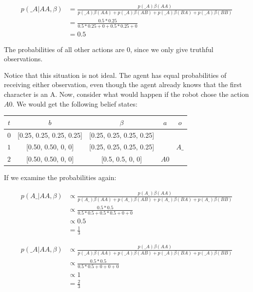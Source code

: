 \documentclass{article}
\begin{document}
\begin{align*}
	p(\_A | AA, \beta) &= \frac{ p(\_A)\beta(AA) }{ p(\_A)\beta(AA) + p(\_A)\beta(AB) + p(\_A)\beta(BA) + p(\_A)\beta(BB)} \\
	&= \frac{0.5 * 0.25}{0.5 * 0.25 + 0 + 0.5 * 0.25 + 0} \\
	&= 0.5
\end{align*}

The probabilities of all other actions are 0, since we only give truthful observations.

Notice that this situation is not ideal. The agent has equal probabilities of receiving either observation, even though the agent already knows that the first character is an A. Now, consider what would happen if the robot chose the action $A0$. We would get the following belief states: 


\begin{center}
\begin{tabular}{|c| c| c| c | c|}
	\hline
	$t$ & $b$ & $\beta$ & $a$ & $o$ \\
	\hline
	$0$ & [0.25, 0.25, 0.25, 0.25] & [0.25, 0.25, 0.25, 0.25] & & \\
	\hline
	$1$ & [0.50, 0.50, 0, 0] & [0.25, 0.25, 0.25, 0.25] & & $A\_$ \\
	\hline
	$2$ & [0.50, 0.50, 0, 0] & [0.5, 0.5, 0, 0] & $A0$  &  \\
	\hline
\end{tabular}
\end{center}

If we examine the probabilities again: 

\begin{align*}
	p(A\_|AA, \beta) &\propto \frac{ p(A\_)\beta(AA) }{ p(A\_)\beta(AA) + p(A\_)\beta(AB) + p(A\_)\beta(BA) + p(A\_)\beta(BB)} \\
	&\propto \frac{0.5 * 0.5}{0.5 * 0.5 + 0.5 * 0.5 + 0 + 0} \\
	&\propto 0.5 \\
	&= \frac{1}{3}
\end{align*}

\begin{align*}
	p(\_A|AA, \beta) &\propto \frac{ p(\_A)\beta(AA) }{ p(\_A)\beta(AA) + p(\_A)\beta(AB) + p(\_A)\beta(BA) + p(\_A)\beta(BB)} \\
	&\propto \frac{0.5 * 0.5}{0.5 * 0.5 + 0 + 0 + 0} \\
	&\propto 1 \\
	&= \frac{2}{3}
\end{align*}
 
\end{document}
